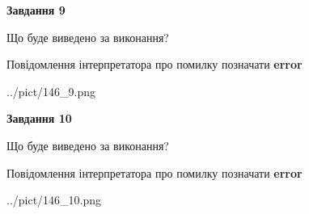 \documentclass[12pt, ukrainian]{article}
\begin{document}
{{\begin {center}\textbf{Завдання 9}\end {center}}\par
Що буде виведено за виконання? \par
Повідомлення інтерпретатора про помилку позначати \textbf{error}

\begin{center}
	{../pict/146_9.png}
\end{center}
\newpage

{\begin {center}\textbf{Завдання 10}\end {center}}\par
Що буде виведено за виконання? \par
Повідомлення інтерпретатора про помилку позначати \textbf{error}

\begin{center}
	{../pict/146_10.png}
\end{center}
\newpage

}
\end{document}
